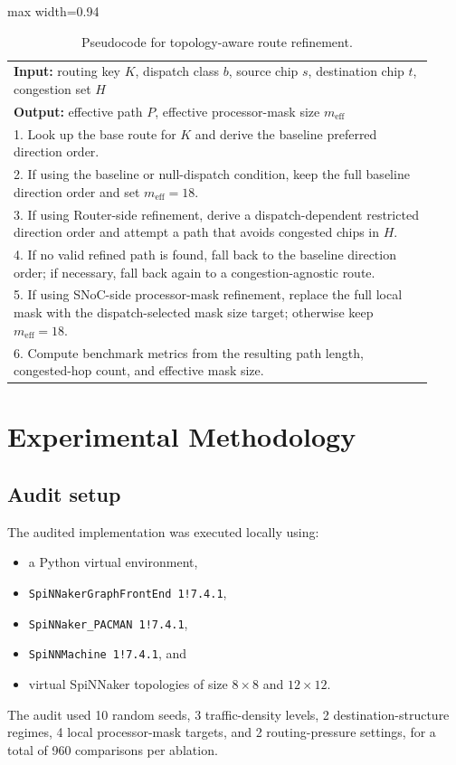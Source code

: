 \documentclass[11pt]{article}
\begin{document}
\begin{table}[H]
\centering
\caption{Pseudocode for topology-aware route refinement.}
\label{alg:refinement}
\begin{adjustbox}{max width=0.94\linewidth}
\begin{tabular}{p{0.92\linewidth}}
\toprule
\textbf{Input:} routing key $K$, dispatch class $b$, source chip $s$, destination chip $t$, congestion set $H$ \\
\textbf{Output:} effective path $P$, effective processor-mask size $m_{\mathrm{eff}}$ \\
\midrule
1. Look up the base route for $K$ and derive the baseline preferred direction order. \\
2. If using the baseline or null-dispatch condition, keep the full baseline direction order and set $m_{\mathrm{eff}}=18$. \\
3. If using Router-side refinement, derive a dispatch-dependent restricted direction order and attempt a path that avoids congested chips in $H$. \\
4. If no valid refined path is found, fall back to the baseline direction order; if necessary, fall back again to a congestion-agnostic route. \\
5. If using SNoC-side processor-mask refinement, replace the full local mask with the dispatch-selected mask size target; otherwise keep $m_{\mathrm{eff}}=18$. \\
6. Compute benchmark metrics from the resulting path length, congested-hop count, and effective mask size. \\
\bottomrule
\end{tabular}
\end{adjustbox}
\end{table}

\section{Experimental Methodology}
\subsection{Audit setup}
The audited implementation was executed locally using:
\begin{itemize}
    \item a Python virtual environment,
    \item \texttt{SpiNNakerGraphFrontEnd 1!7.4.1},
    \item \texttt{SpiNNaker\_PACMAN 1!7.4.1},
    \item \texttt{SpiNNMachine 1!7.4.1}, and
    \item virtual SpiNNaker topologies of size $8\times 8$ and $12\times 12$.
\end{itemize}
The audit used 10 random seeds, 3 traffic-density levels, 2 destination-structure regimes, 4 local processor-mask targets, and 2 routing-pressure settings, for a total of 960 comparisons per ablation.
\end{document}
